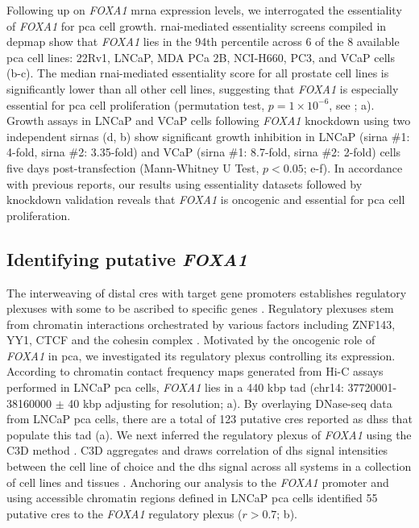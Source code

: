 Following up on \emph{FOXA1} \gls{mrna} expression levels, we interrogated the essentiality of \emph{FOXA1} for \gls{pca} cell growth.
\gls{rnai}-mediated essentiality screens compiled in \gls{depmap} show that \emph{FOXA1} lies in the 94th percentile across 6 of the 8 available \gls{pca} cell lines: 22Rv1, LNCaP, MDA PCa 2B, NCI-H660, PC3, and VCaP cells (b-c).
The median \gls{rnai}-mediated essentiality score for all prostate cell lines is significantly lower than all other cell lines, suggesting that \emph{FOXA1} is especially essential for \gls{pca} cell proliferation (permutation test, $p = 1 \times 10^{-6}$, see ; a).
Growth assays in LNCaP and VCaP cells following \emph{FOXA1} knockdown using two independent \gls{sirna}s (d, b) show significant growth inhibition in LNCaP (\gls{sirna} \#1: 4-fold, \gls{sirna} \#2: 3.35-fold) and VCaP (\gls{sirna} \#1: 8.7-fold, \gls{sirna} \#2: 2-fold) cells five days post-transfection (Mann-Whitney U Test, $p<0.05$; e-f).
In accordance with previous reports, our results using essentiality datasets followed by knockdown validation reveals that \emph{FOXA1} is oncogenic and essential for \gls{pca} cell proliferation.

\subsection{Identifying putative \emph{FOXA1} }

The interweaving of distal \glspl{cre} with target gene promoters establishes regulatory plexuses with some to be ascribed to specific genes \cite{sallariConvergenceDispersedRegulatory2016,baileyNoncodingSomaticInherited2016}.
Regulatory plexuses stem from chromatin interactions orchestrated by various factors including ZNF143, YY1, CTCF and the cohesin complex \cite{phillipsCTCFMasterWeaver2009,weintraubYY1StructuralRegulator2017,baileyZNF143ProvidesSequence2015}.
Motivated by the oncogenic role of \emph{FOXA1} in \gls{pca}, we investigated its regulatory plexus controlling its expression.
According to chromatin contact frequency maps generated from Hi-C assays performed in LNCaP \gls{pca} cells, \emph{FOXA1} lies in a 440 kbp \gls{tad} (chr14: 37720001-38160000 $\pm$ 40 kbp adjusting for resolution; a).
By overlaying DNase-seq data from LNCaP \gls{pca} cells, there are a total of 123 putative \glspl{cre} reported as \glspl{dhs} that populate this \gls{tad} (a).
We next inferred the regulatory plexus of \emph{FOXA1} using the C3D method \cite{mehdiC3DToolPredict2019}.
C3D aggregates and draws correlation of \gls{dhs} signal intensities between the cell line of choice and the \gls{dhs} signal across all systems in a collection of cell lines and tissues \cite{mehdiC3DToolPredict2019}.
Anchoring our analysis to the \emph{FOXA1} promoter and using accessible chromatin regions defined in LNCaP \gls{pca} cells identified 55 putative \glspl{cre} to the \emph{FOXA1} regulatory plexus ($r > 0.7$; b).

